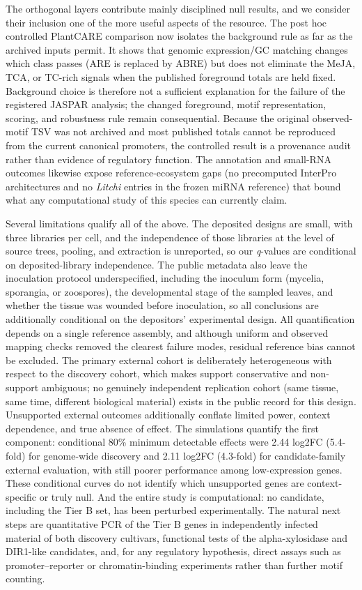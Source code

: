 \documentclass[12pt,letterpaper]{article}
\begin{document}
The orthogonal layers contribute mainly disciplined null results, and we consider their inclusion one of the more useful aspects of the resource. The post hoc controlled PlantCARE comparison now isolates the background rule as far as the archived inputs permit. It shows that genomic expression/GC matching changes which class passes (ARE is replaced by ABRE) but does not eliminate the MeJA, TCA, or TC-rich signals when the published foreground totals are held fixed. Background choice is therefore not a sufficient explanation for the failure of the registered JASPAR analysis; the changed foreground, motif representation, scoring, and robustness rule remain consequential. Because the original observed-motif TSV was not archived and most published totals cannot be reproduced from the current canonical promoters, the controlled result is a provenance audit rather than evidence of regulatory function. The annotation and small-RNA outcomes likewise expose reference-ecosystem gaps (no precomputed InterPro architectures and no \textit{Litchi} entries in the frozen miRNA reference) that bound what any computational study of this species can currently claim.

Several limitations qualify all of the above. The deposited designs are small, with three libraries per cell, and the independence of those libraries at the level of source trees, pooling, and extraction is unreported, so our \textit{q}-values are conditional on deposited-library independence. The public metadata also leave the inoculation protocol underspecified, including the inoculum form (mycelia, sporangia, or zoospores), the developmental stage of the sampled leaves, and whether the tissue was wounded before inoculation, so all conclusions are additionally conditional on the depositors' experimental design. All quantification depends on a single reference assembly, and although uniform and observed mapping checks removed the clearest failure modes, residual reference bias cannot be excluded. The primary external cohort is deliberately heterogeneous with respect to the discovery cohort, which makes support conservative and non-support ambiguous; no genuinely independent replication cohort (same tissue, same time, different biological material) exists in the public record for this design. Unsupported external outcomes additionally conflate limited power, context dependence, and true absence of effect. The simulations quantify the first component: conditional 80\% minimum detectable effects were 2.44 log2FC (5.4-fold) for genome-wide discovery and 2.11 log2FC (4.3-fold) for candidate-family external evaluation, with still poorer performance among low-expression genes. These conditional curves do not identify which unsupported genes are context-specific or truly null. And the entire study is computational: no candidate, including the Tier B set, has been perturbed experimentally. The natural next steps are quantitative PCR of the Tier B genes in independently infected material of both discovery cultivars, functional tests of the alpha-xylosidase and DIR1-like candidates, and, for any regulatory hypothesis, direct assays such as promoter–reporter or chromatin-binding experiments rather than further motif counting.
\end{document}
